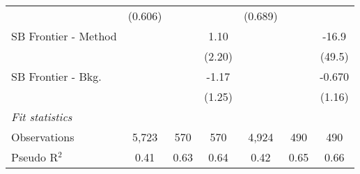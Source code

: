 \begin{tabular}{lcccccc}
                                  & (0.606)      &             &              & (0.689)      &         &   \\   
   SB Frontier - Method           &              &             & 1.10         &              &         & -16.9\\   
                                  &              &             & (2.20)       &              &         & (49.5)\\   
   SB Frontier - Bkg.             &              &             & -1.17        &              &         & -0.670\\   
                                  &              &             & (1.25)       &              &         & (1.16)\\   
   \midrule
   \emph{Fit statistics}\\
   Observations                   & 5,723        & 570         & 570          & 4,924        & 490     & 490\\  
   Pseudo R$^2$                   & 0.41         & 0.63        & 0.64         & 0.42         & 0.65    & 0.66\\  
   

\end{tabular}
